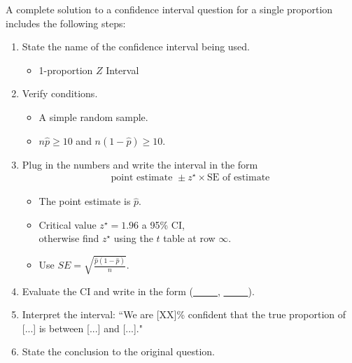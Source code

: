 \begin{termBox}{
A complete solution to a confidence interval question for a single proportion includes the following steps:
\begin{enumerate}
\setlength{\itemsep}{0mm}
\item State the name of the confidence interval being used.\vspace{-1.5mm}
\begin{itemize}
\setlength{\itemsep}{0mm}
\item 1-proportion $Z$ Interval
\end{itemize}
\item Verify conditions.\vspace{-1.5mm}
\begin{itemize}
\setlength{\itemsep}{0mm}
\item A simple random sample.
\item $n\hat{p} \geq10$ and $n(1-\hat{p})\geq10$.
\end{itemize}
\item Plug in the numbers and write the interval in the form\vspace{-1.5mm}
\begin{align*}
\text{point estimate } \pm z^\star \times \text{SE of estimate}
\end{align*}
\begin{itemize}
\item The point estimate is $\hat{p}$.
\item Critical value $z^\star=1.96$ a 95\% CI, \\
otherwise find $z^\star$ using the $t$ table at row $\infty$.
\item Use $SE = \sqrt{\frac{\hat{p}(1-\hat{p})}{n}}$.
\end{itemize}
\item Evaluate the CI and write in the form (\underline{\ \ \ \ \ }, \underline{\ \ \ \ \ }).
\item Interpret the interval:  ``We are [XX]\% confident that the true proportion of [...] is between [...] and [...]."
\item State the conclusion to the original question.
\end{enumerate}}
\end{termBox}

